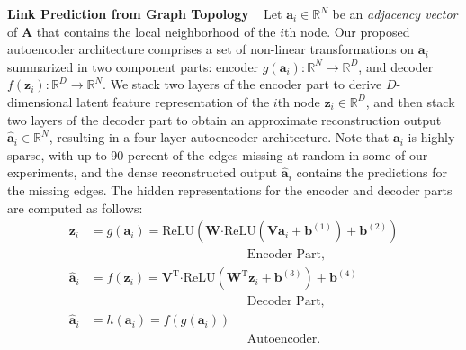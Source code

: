 \documentclass[letterpaper, conference]{IEEEtran}
\begin{document}
\noindent \textbf{Link Prediction from Graph Topology} ~ Let $\mathbf{a}_i \in \mathbb{R}^N$ be an \emph{adjacency vector} of $\mathbf{A}$ that contains the local neighborhood of the $i$th node. Our proposed autoencoder architecture comprises a set of non-linear transformations on $\mathbf{a}_i$ summarized in two component parts: encoder $g(\mathbf{a}_i)\colon \mathbb{R}^N \to \mathbb{R}^D$, and decoder $f(\mathbf{z}_i)\colon \mathbb{R}^D \to \mathbb{R}^N$. We stack two layers of the encoder part to derive $D$-dimensional latent feature representation of the $i$th node $\mathbf{z}_i \in \mathbb{R}^D$, and then stack two layers of the decoder part to obtain an approximate reconstruction output $\mathbf{\hat{a}}_i \in \mathbb{R}^N$, resulting in a four-layer autoencoder architecture. Note that $\mathbf{a}_i$ is highly sparse, with up to 90 percent of the edges missing at random in some of our experiments, and the dense reconstructed output $\mathbf{\hat{a}}_i$ contains the predictions for the missing edges. The hidden representations for the encoder and decoder parts are computed as follows:
\begin{align*}
\mathbf{z}_i &= g\left(\mathbf{a}_i\right) = \text{ReLU}\left(\mathbf{W} \boldsymbol{\cdot} \text{ReLU}\left(\mathbf{V}\mathbf{a}_i + \mathbf{b}^{(1)}\right) + \mathbf{b}^{(2)}\right) \\ &\hspace{150pt} \text{Encoder Part}, \\
\mathbf{\hat{a}}_i &= f\left(\mathbf{z}_i\right) = \mathbf{V}^\text{T} \boldsymbol{\cdot} \text{ReLU}\left(\mathbf{W}^\text{T}\mathbf{z}_i + \mathbf{b}^{(3)}\right) + \mathbf{b}^{(4)} \\ &\hspace{150pt} \text{Decoder Part}, \\
\mathbf{\hat{a}}_i &= h\left(\mathbf{a}_i\right) = f\left(g\left(\mathbf{a}_i\right)\right) \\ &\hspace{150pt} \text{Autoencoder}.
\end{align*}
\end{document}
